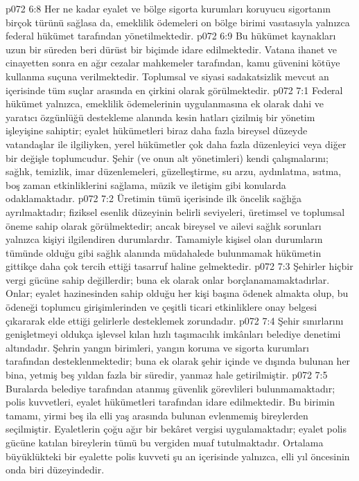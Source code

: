 \vs p072 6:8 Her ne kadar eyalet ve bölge sigorta kurumları koruyucu sigortanın birçok türünü sağlasa da, emeklilik ödemeleri on bölge birimi vasıtasıyla yalnızca federal hükümet tarafından yönetilmektedir.
\vs p072 6:9 Bu hükümet kaynakları uzun bir süreden beri dürüst bir biçimde idare edilmektedir. Vatana ihanet ve cinayetten sonra en ağır cezalar mahkemeler tarafından, kamu güvenini kötüye kullanma suçuna verilmektedir. Toplumsal ve siyasi sadakatsizlik mevcut an içerisinde tüm suçlar arasında en çirkini olarak görülmektedir.
\vs p072 7:1 Federal hükümet yalnızca, emeklilik ödemelerinin uygulanmasına ek olarak dahi ve yaratıcı özgünlüğü destekleme alanında kesin hatları çizilmiş bir yönetim işleyişine sahiptir; eyalet hükümetleri biraz daha fazla bireysel düzeyde vatandaşlar ile ilgiliyken, yerel hükümetler çok daha fazla düzenleyici veya diğer bir değişle toplumcudur. Şehir (ve onun alt yönetimleri) kendi çalışmalarını; sağlık, temizlik, imar düzenlemeleri, güzelleştirme, su arzu, aydınlatma, ısıtma, boş zaman etkinliklerini sağlama, müzik ve iletişim gibi konularda odaklamaktadır.
\vs p072 7:2 Üretimin tümü içerisinde ilk öncelik sağlığa ayrılmaktadır; fiziksel esenlik düzeyinin belirli seviyeleri, üretimsel ve toplumsal öneme sahip olarak görülmektedir; ancak bireysel ve ailevi sağlık sorunları yalnızca kişiyi ilgilendiren durumlardır. Tamamiyle kişisel olan durumların tümünde olduğu gibi sağlık alanında müdahalede bulunmamak hükümetin gittikçe daha çok tercih ettiği tasarruf haline gelmektedir.
\vs p072 7:3 Şehirler hiçbir vergi gücüne sahip değillerdir; buna ek olarak onlar borçlanamamaktadırlar. Onlar; eyalet hazinesinden sahip olduğu her kişi başına ödenek almakta olup, bu ödeneği toplumcu girişimlerinden ve çeşitli ticari etkinliklere onay belgesi çıkararak elde ettiği gelirlerle desteklemek zorundadır.
\vs p072 7:4 Şehir sınırlarını genişletmeyi oldukça işlevsel kılan hızlı taşımacılık imkânları belediye denetimi altındadır. Şehrin yangın birimleri, yangın koruma ve sigorta kurumları tarafından desteklenmektedir; buna ek olarak şehir içinde ve dışında bulunan her bina, yetmiş beş yıldan fazla bir süredir, yanmaz hale getirilmiştir.
\vs p072 7:5 Buralarda belediye tarafından atanmış güvenlik görevlileri bulunmamaktadır; polis kuvvetleri, eyalet hükümetleri tarafından idare edilmektedir. Bu birimin tamamı, yirmi beş ila elli yaş arasında bulunan evlenmemiş bireylerden seçilmiştir. Eyaletlerin çoğu ağır bir bekâret vergisi uygulamaktadır; eyalet polis gücüne katılan bireylerin tümü bu vergiden muaf tutulmaktadır. Ortalama büyüklükteki bir eyalette polis kuvveti şu an içerisinde yalnızca, elli yıl öncesinin onda biri düzeyindedir.
